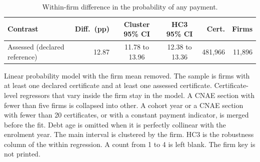 \begin{table}[H]
\centering
\caption{Within-firm difference in the probability of any payment.}\label{tab:within-firm}
\footnotesize
\begin{tabular}{@{}l r cc rr@{}}
\toprule
Contrast & Diff.\ (pp) & Cluster 95\% CI & HC3 95\% CI & Cert. & Firms \\
\midrule
Assessed (declared reference) & 12.87 & 11.78 to 13.96 & 12.38 to 13.36 & 481,966 & 11,896 \\
\bottomrule
\end{tabular}

\vspace{0.4em}
\begin{minipage}{0.95\textwidth}
\footnotesize
Linear probability model with the firm mean removed. The sample is firms with at least one declared certificate and at least one assessed certificate. Certificate-level regressors that vary inside the firm stay in the model. A CNAE section with fewer than five firms is collapsed into other. A cohort year or a CNAE section with fewer than 20 certificates, or with a constant payment indicator, is merged before the fit. Debt age is omitted when it is perfectly collinear with the enrolment year. The main interval is clustered by the firm. HC3 is the robustness column of the within regression. A count from 1 to 4 is left blank. The firm key is not printed.
\end{minipage}
\end{table}
